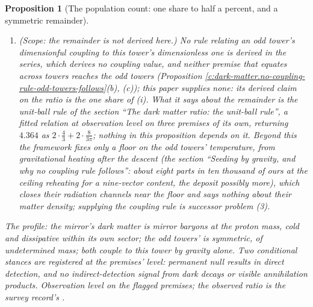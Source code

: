 \documentclass[11pt]{article}
\newtheorem{proposition}[theorem]{Proposition}
\theoremstyle{definition}
\theoremstyle{plain}
\begin{document}
\begin{proposition}[The population count: one share to half a percent, and a symmetric remainder]
\begin{enumerate}
\item[(iii)] \emph{(Scope: the remainder is not derived here.)} No rule relating an odd tower's dimensionful coupling to this tower's dimensionless one is derived in the series, which derives no coupling value, and neither premise that equates across towers reaches the odd towers (Proposition \ref{c:dark-matter.no-coupling-rule-odd-towers-follows}(b), (c)); this paper supplies none: its derived claim on the ratio is the one share of (i). What it says about the remainder is the unit-ball rule of the section ``The dark matter ratio: the unit-ball rule'', a fitted relation at observation level on three premises of its own, returning $4.364$ as $2 \cdot \tfrac{4}{3} + 2 \cdot \tfrac{8}{3\pi}$; nothing in this proposition depends on it. Beyond this the framework fixes only a floor on the odd towers' temperature, from gravitational heating after the descent (the section ``Seeding by gravity, and why no coupling rule follows'': about eight parts in ten thousand of ours at the ceiling reheating for a nine-vector content, the deposit possibly more), which closes their radiation channels near the floor and says nothing about their matter density; supplying the coupling rule is successor problem (3).
\end{enumerate}
The profile: the mirror's dark matter is mirror baryons at the proton mass, cold and dissipative within its own sector; the odd towers' is symmetric, of undetermined mass; both couple to this tower by gravity alone. Two conditional stances are registered at the premises' level: permanent null results in direct detection, and no indirect-detection signal from dark decays or visible annihilation products. Observation level on the flagged premises; the observed ratio is the survey record's \cite{Planck2018}.
\end{proposition}
\end{document}
